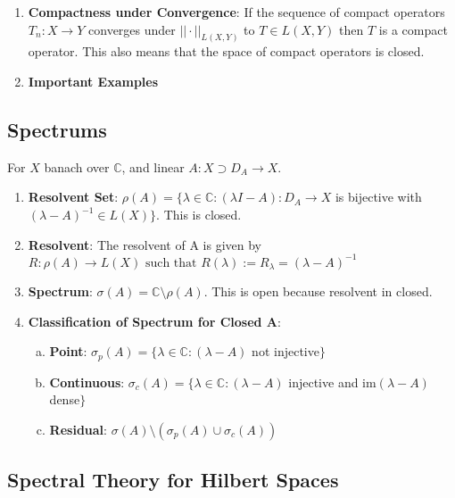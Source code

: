 \documentclass{article}
\begin{document}
\begin{enumerate}
    \item \textbf{Compactness under Convergence}: If the sequence of compact operators \(T_n : X \to Y\) converges under \(||\cdot||_{L(X,Y)}\) to \(T \in L(X,Y)\) then \(T\) is a compact operator. This also means that the space of compact operators is closed.

    \item \textbf{Important Examples}
\end{enumerate}

\subsection*{Spectrums}

For \(X\) banach over \(\mathbb{C}\), and linear \(A:X \supset D_A \to X\).

\begin{enumerate}
    \item \textbf{Resolvent Set}: \(\rho(A) = \{\lambda \in \mathbb{C}: (\lambda I - A): D_A \to X\) is bijective with \((\lambda - A)^{-1} \in L(X)\}\). This is closed.

    \item \textbf{Resolvent}: The resolvent of A is given by \(R: \rho(A) \to L(X) \text{ such that } R(\lambda) :=R_\lambda= (\lambda - A)^{-1}\)

    \item \textbf{Spectrum}: \(\sigma(A) = \mathbb{C}\setminus \rho(A)\). This is open because resolvent in closed.

    \item \textbf{Classification of Spectrum for Closed A}:
    \begin{enumerate}[a.]
        \item \textbf{Point}: \(\sigma_p(A) = \{\lambda \in \mathbb{C}:(\lambda- A)\) not injective\(\}\)
        \item \textbf{Continuous}: \(\sigma_c(A) = \{\lambda \in \mathbb{C}:(\lambda- A)\) injective and im\((\lambda- A)\) dense\(\}\)
        \item \textbf{Residual}: \(\sigma(A)\setminus(\sigma_p(A) \cup \sigma_c(A))\)
    \end{enumerate}

\end{enumerate}

\subsection*{Spectral Theory for Hilbert Spaces}
\end{document}
